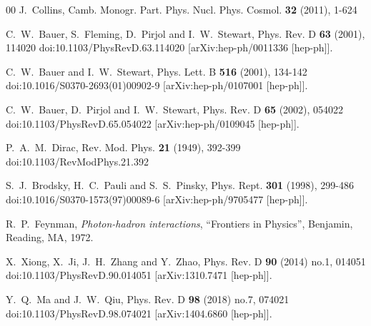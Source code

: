 \documentclass[preprint,12pt]{elsarticle}
\begin{document}
\begin{thebibliography}{00}
J.~Collins,
Camb. Monogr. Part. Phys. Nucl. Phys. Cosmol. \textbf{32} (2011), 1-624

C.~W.~Bauer, S.~Fleming, D.~Pirjol and I.~W.~Stewart,
Phys. Rev. D \textbf{63} (2001), 114020
doi:10.1103/PhysRevD.63.114020
[arXiv:hep-ph/0011336 [hep-ph]].

C.~W.~Bauer and I.~W.~Stewart,
Phys. Lett. B \textbf{516} (2001), 134-142
doi:10.1016/S0370-2693(01)00902-9
[arXiv:hep-ph/0107001 [hep-ph]].

C.~W.~Bauer, D.~Pirjol and I.~W.~Stewart,
Phys. Rev. D \textbf{65} (2002), 054022
doi:10.1103/PhysRevD.65.054022
[arXiv:hep-ph/0109045 [hep-ph]].

P.~A.~M.~Dirac,
Rev. Mod. Phys. \textbf{21} (1949), 392-399
doi:10.1103/RevModPhys.21.392

S.~J.~Brodsky, H.~C.~Pauli and S.~S.~Pinsky,
Phys. Rept. \textbf{301} (1998), 299-486
doi:10.1016/S0370-1573(97)00089-6
[arXiv:hep-ph/9705477 [hep-ph]].

R.~P.~Feynman,
\emph{Photon-hadron interactions},  ``Frontiers in Physics'',
Benjamin, Reading, MA, 1972.

X.~Xiong, X.~Ji, J.~H.~Zhang and Y.~Zhao,
Phys. Rev. D \textbf{90} (2014) no.1, 014051
doi:10.1103/PhysRevD.90.014051
[arXiv:1310.7471 [hep-ph]].

Y.~Q.~Ma and J.~W.~Qiu,
Phys. Rev. D \textbf{98} (2018) no.7, 074021
doi:10.1103/PhysRevD.98.074021
[arXiv:1404.6860 [hep-ph]].


\end{thebibliography}
\end{document}
